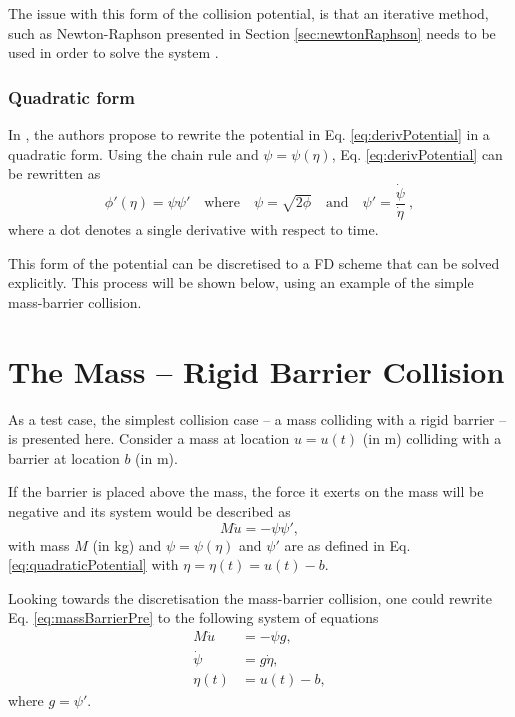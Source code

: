 The issue with this form of the collision potential, is that an iterative method, such as Newton-Raphson presented in Section \ref{sec:newtonRaphson} needs to be used in order to solve the system \cite{Ducceschi2021}.

\subsubsection{Quadratic form}
In \cite{Ducceschi2021}, the authors propose to rewrite the potential in Eq. \eqref{eq:derivPotential} in a quadratic form. Using the chain rule and  $\psi = \psi(\eta)$, Eq. \eqref{eq:derivPotential} can be rewritten as
\begin{equation}\label{eq:quadraticPotential}
    \phi'(\eta) = \psi\psi' \quad \text{where} \quad \psi = \sqrt{2\phi} \quad \text{and} \quad \psi' = \frac{\dot{\psi}}{\dot{\eta}}\ ,
\end{equation}
where a dot denotes a single derivative with respect to time. 

This form of the potential can be discretised to a FD scheme that can be solved explicitly. This process will be shown below, using an example of the simple mass-barrier collision. 

\section{The Mass -- Rigid Barrier Collision}\label{sec:massRigidBarrier}
As a test case, the simplest collision case -- a mass colliding with a rigid barrier -- is presented here. Consider a mass at location $u = u(t)$ (in m) colliding with a barrier at location $b$ (in m).

If the barrier is placed above the mass, the force it exerts on the mass will be negative and its system would be described as
\begin{equation}\label{eq:massBarrierPre}
    M\ddot u = -\psi\psi',
\end{equation}
with mass $M$ (in kg) and $\psi = \psi(\eta)$ and $\psi'$ are as defined in Eq. \eqref{eq:quadraticPotential} with $\eta = \eta(t) = u(t) - b$. 

Looking towards the discretisation the mass-barrier collision, one could rewrite Eq. \eqref{eq:massBarrierPre} to the following system of equations
\begin{subequations}\label{eq:massBarrier}
    \begin{align}
        M\ddot u &= -\psi g,\label{eq:massBarrierPDE1}\\
        \dot\psi &= g \dot\eta,\label{eq:massBarrierPDE2}\\
        \eta(t) &= u(t) - b,\label{eq:massBarrierPDE3}
    \end{align}
\end{subequations} 
where $g = \psi'$.

